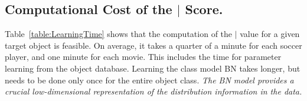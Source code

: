 {					\subsection{Computational Cost of the $\mid$ Score.}
					Table~\ref{table:LearningTime} shows that the computation of the $\mid$ value for a given target object is feasible. On average, it takes a quarter of a minute for each soccer player, and one minute for each movie. This includes the time for parameter learning from the object database.
					Learning the class model BN takes longer, but needs to be done only once for the entire object class. 
					{\em The BN model 
						provides a crucial %
						low-dimensional representation of the 
						distribution information in the data.}
					
					\begin{table}[htbp]
						\centering
						\begin{subtable}
							\centering
			
\end{subtable}
\end{table}}

